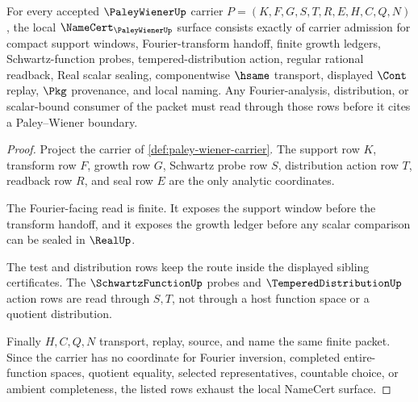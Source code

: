 \begin{theorem}
\label{thm:paley-wiener-namecert-obligations}
For every accepted $\PaleyWienerUp$ carrier $P=(K,F,G,S,T,R,E,H,C,Q,N)$, the local $\NameCert_{\PaleyWienerUp}$ surface consists exactly of carrier admission for compact support windows, Fourier-transform handoff, finite growth ledgers, Schwartz-function probes, tempered-distribution action, regular rational readback, Real scalar sealing, componentwise $\hsame$ transport, displayed $\Cont$ replay, $\Pkg$ provenance, and local naming. Any Fourier-analysis, distribution, or scalar-bound consumer of the packet must read through those rows before it cites a Paley--Wiener boundary.
\end{theorem}
\begin{proof}
Project the carrier of \autoref{def:paley-wiener-carrier}. The support row $K$, transform row $F$, growth row $G$, Schwartz probe row $S$, distribution action row $T$, readback row $R$, and seal row $E$ are the only analytic coordinates.

The Fourier-facing read is finite. It exposes the support window before the transform handoff, and it exposes the growth ledger before any scalar comparison can be sealed in $\RealUp$.

The test and distribution rows keep the route inside the displayed sibling certificates. The $\SchwartzFunctionUp$ probes and $\TemperedDistributionUp$ action rows are read through $S,T$, not through a host function space or a quotient distribution.

Finally $H,C,Q,N$ transport, replay, source, and name the same finite packet. Since the carrier has no coordinate for Fourier inversion, completed entire-function spaces, quotient equality, selected representatives, countable choice, or ambient completeness, the listed rows exhaust the local NameCert surface.
\end{proof}

